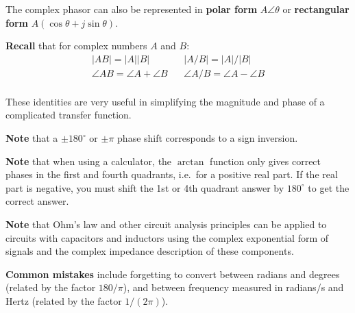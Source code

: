 The complex phasor can also be represented in \textbf{polar form} $A\angle
\theta$ or \textbf{rectangular form} $A(\cos\theta + j \sin\theta)$.

\textbf{Recall} that for complex numbers $A$ and $B$:
\begin{equation}
\begin{split}
|AB| = |A||B|~~&~~|A/B| = |A|/|B|\\
\angle AB = \angle A + \angle B~~&~~\angle A/B = \angle A - \angle B\\
\end{split}
\end{equation}

These identities are very useful in simplifying the magnitude and
phase of a complicated transfer function.

\textbf{Note} that a $\pm 180^\circ$ or $\pm \pi$ phase shift
corresponds to a sign inversion.

\textbf{Note} that when using a calculator, the $\arctan$ function
only gives correct phases in the first and fourth quadrants, i.e.\ for 
a positive real part.  If the real part is negative, you must
shift the 1st or 4th quadrant answer by $180^\circ$ to get the correct
answer.

\textbf{Note} that Ohm's law and other circuit analysis principles can be applied to circuits with capacitors and
inductors using the complex exponential form of signals and the
complex impedance description of these components.

\textbf{Common mistakes} include forgetting to convert between radians and
degrees (related by the factor $180/\pi$), and between frequency
measured in radians/s and Hertz (related by the factor $1/(2 \pi)$).

\clearpage


